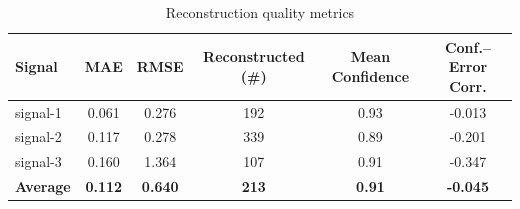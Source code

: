 \begin{table}[h]
\centering
\caption{Reconstruction quality metrics}
\label{tab:reconstruction}
\begin{tabular}{lccccc}
\toprule
Signal & MAE & RMSE & Reconstructed (\#) & Mean Confidence & Conf.–Error Corr. \\
\midrule
signal-1 & 0.061 & 0.276 & 192 & 0.93 & -0.013 \\
signal-2 & 0.117 & 0.278 & 339 & 0.89 & -0.201 \\
signal-3 & 0.160 & 1.364 & 107 & 0.91 & -0.347 \\
\midrule
\textbf{Average} & \textbf{0.112} & \textbf{0.640} & \textbf{213} & \textbf{0.91} & \textbf{-0.045} \\
\bottomrule
\end{tabular}
\end{table}